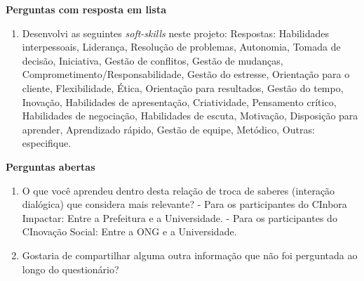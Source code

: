\par\vspace{1\baselineskip}
\textbf{Perguntas com resposta em lista}
\begin{enumerate}
    \item Desenvolvi as seguintes \textit{soft-skills }neste projeto:
Respostas: 
Habilidades interpessoais, Liderança, Resolução de problemas, Autonomia, Tomada de decisão, Iniciativa, Gestão de conflitos, Gestão de mudanças, Comprometimento/Responsabilidade, Gestão do estresse, Orientação para o cliente, Flexibilidade, Ética, Orientação para resultados, Gestão do tempo, Inovação, Habilidades de apresentação, Criatividade, Pensamento crítico, Habilidades de negociação, Habilidades de escuta, Motivação, Disposição para aprender, Aprendizado rápido, Gestão de equipe, Metódico, Outras: especifique.
\end{enumerate}
\par\vspace{1\baselineskip}
\textbf{Perguntas abertas}
\begin{enumerate}
    \item O que você aprendeu dentro desta relação de troca de saberes (interação dialógica) que considera mais relevante?
      - Para os participantes do CInbora Impactar: Entre a Prefeitura e a Universidade.
    - Para os participantes do CInovação Social: Entre a \gls{ONG} e a Universidade.
    \item Gostaria de compartilhar alguma outra informação que não foi perguntada ao longo do questionário?
\end{enumerate}
\par\vspace{1\baselineskip}